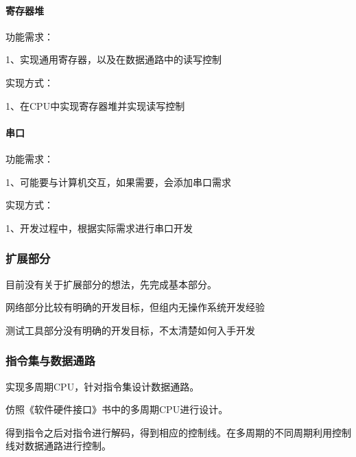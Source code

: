 \documentclass[12pt,a4paper]{article}
\begin{document}
\begin{CJK}{UTF8}{gbsn}
			\paragraph{寄存器堆}
				\begin{description*}
					\setlength{\itemsep}{2pt}
					\item[\quad 功能需求：]\hfill\par
						1、实现通用寄存器，以及在数据通路中的读写控制
					\item[\quad 实现方式：]\hfill\par
						1、在CPU中实现寄存器堆并实现读写控制
				\end{description*}
			
			\paragraph{串口}
				\begin{description*}
					\setlength{\itemsep}{2pt}
					\item[\quad 功能需求：]\hfill\par
						1、可能要与计算机交互，如果需要，会添加串口需求
					\item[\quad 实现方式：]\hfill\par
						1、开发过程中，根据实际需求进行串口开发
				\end{description*}

		\subsubsection{扩展部分}
			目前没有关于扩展部分的想法，先完成基本部分。\par
			网络部分比较有明确的开发目标，但组内无操作系统开发经验\par
			测试工具部分没有明确的开发目标，不太清楚如何入手开发

		\subsubsection{指令集与数据通路}
			实现多周期CPU，针对指令集设计数据通路。\par
			仿照《软件硬件接口》书中的多周期CPU进行设计。\par
			得到指令之后对指令进行解码，得到相应的控制线。在多周期的不同周期利用控制线对数据通路进行控制。


\end{CJK}
\end{document}
